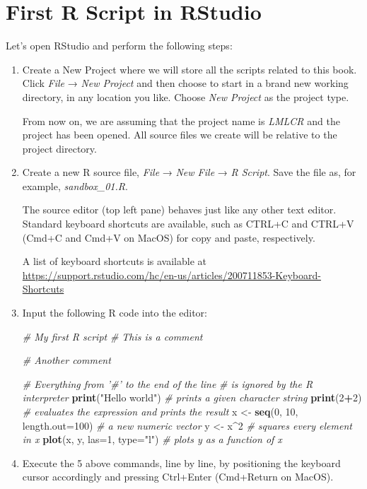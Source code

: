 \documentclass[10pt,b5paper,krantz1]{krantz}
\newenvironment{Shaded}{\begin{snugshade}}{\end{snugshade}}
\newcommand{\CommentTok}[1]{\textcolor[rgb]{0.37,0.37,0.37}{\textit{#1}}}
\newcommand{\DataTypeTok}[1]{\textcolor[rgb]{0.27,0.27,0.27}{#1}}
\newcommand{\DecValTok}[1]{\textcolor[rgb]{0.06,0.06,0.06}{#1}}
\newcommand{\KeywordTok}[1]{\textcolor[rgb]{0.27,0.27,0.27}{\textbf{#1}}}
\newcommand{\NormalTok}[1]{#1}
\newcommand{\OperatorTok}[1]{\textcolor[rgb]{0.43,0.43,0.43}{\textbf{#1}}}
\newcommand{\StringTok}[1]{\textcolor[rgb]{0.5,0.5,0.5}{#1}}
\begin{document}
\hypertarget{first-r-script-in-rstudio}{%
\section{First R Script in RStudio}\label{first-r-script-in-rstudio}}

Let's open RStudio and perform the following steps:

\begin{enumerate}
\def\labelenumi{\arabic{enumi}.}
\item
  Create a New Project where we will store all the scripts
  related to this book. Click \emph{File} → \emph{New Project}
  and then choose to start in a brand new working directory,
  in any location you like.
  Choose \emph{New Project} as the project type.

  From now on, we are assuming that the project name is \emph{LMLCR}
  and the project has been opened. All source files we create
  will be relative to the project directory.
\item
  Create a new R source file, \emph{File} → \emph{New File} → \emph{R Script}.
  Save the file as, for example, \emph{sandbox\_01.R}.

  The source editor (top left pane) behaves just like any other text editor.
  Standard keyboard shortcuts are available, such as CTRL+C
  and CTRL+V (Cmd+C and Cmd+V on MacOS) for copy and paste, respectively.

  A list of keyboard shortcuts is available at
  \url{https://support.rstudio.com/hc/en-us/articles/200711853-Keyboard-Shortcuts}
\item
  Input the following R code into the editor:

\begin{Shaded}
\begin{Highlighting}[]
\CommentTok{# My first R script}
\CommentTok{# This is a comment}

\CommentTok{# Another comment}

\CommentTok{# Everything from '#' to the end of the line}
\CommentTok{#     is ignored by the R interpreter}
\KeywordTok{print}\NormalTok{(}\StringTok{"Hello world"}\NormalTok{) }\CommentTok{# prints a given character string}
\KeywordTok{print}\NormalTok{(}\DecValTok{2}\OperatorTok{+}\DecValTok{2}\NormalTok{) }\CommentTok{# evaluates the expression and prints the result}
\NormalTok{x <-}\StringTok{ }\KeywordTok{seq}\NormalTok{(}\DecValTok{0}\NormalTok{, }\DecValTok{10}\NormalTok{, }\DataTypeTok{length.out=}\DecValTok{100}\NormalTok{) }\CommentTok{# a new numeric vector}
\NormalTok{y <-}\StringTok{ }\NormalTok{x}\OperatorTok{^}\DecValTok{2} \CommentTok{# squares every element in x}
\KeywordTok{plot}\NormalTok{(x, y, }\DataTypeTok{las=}\DecValTok{1}\NormalTok{, }\DataTypeTok{type=}\StringTok{"l"}\NormalTok{) }\CommentTok{# plots y as a function of x}
\end{Highlighting}
\end{Shaded}
\item
  Execute the 5 above commands, line by line,
  by positioning the keyboard cursor accordingly and
  pressing Ctrl+Enter (Cmd+Return on MacOS).


\end{enumerate}
\end{document}

